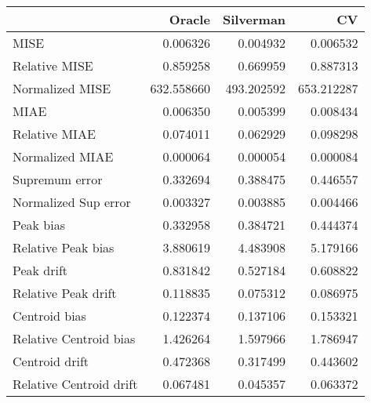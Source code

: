 \begin{tabular}{lrrr}
  \toprule
 & Oracle & Silverman & CV \\ 
  \midrule
MISE & 0.006326 & 0.004932 & 0.006532 \\ 
  Relative MISE & 0.859258 & 0.669959 & 0.887313 \\ 
  Normalized MISE & 632.558660 & 493.202592 & 653.212287 \\ 
  MIAE & 0.006350 & 0.005399 & 0.008434 \\ 
  Relative MIAE & 0.074011 & 0.062929 & 0.098298 \\ 
  Normalized MIAE & 0.000064 & 0.000054 & 0.000084 \\ 
  Supremum error & 0.332694 & 0.388475 & 0.446557 \\ 
  Normalized Sup error & 0.003327 & 0.003885 & 0.004466 \\ 
  Peak bias & 0.332958 & 0.384721 & 0.444374 \\ 
  Relative Peak bias & 3.880619 & 4.483908 & 5.179166 \\ 
  Peak drift & 0.831842 & 0.527184 & 0.608822 \\ 
  Relative Peak drift & 0.118835 & 0.075312 & 0.086975 \\ 
  Centroid bias & 0.122374 & 0.137106 & 0.153321 \\ 
  Relative Centroid bias & 1.426264 & 1.597966 & 1.786947 \\ 
  Centroid drift & 0.472368 & 0.317499 & 0.443602 \\ 
  Relative Centroid drift & 0.067481 & 0.045357 & 0.063372 \\ 
   \bottomrule
\end{tabular}
